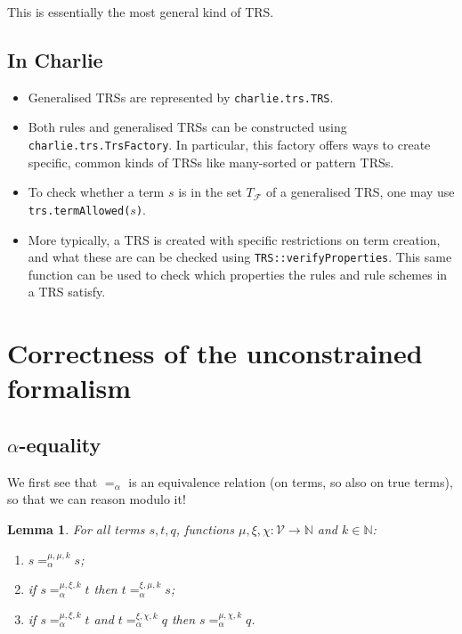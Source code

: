 \documentclass{lmcs}
\theoremstyle{theorem}\newtheorem{theorem}{Theorem}
\theoremstyle{theorem}\newtheorem{lemma}[theorem]{Lemma}
\theoremstyle{theorem}\newtheorem{corollary}[theorem]{Corollary}
\theoremstyle{definition}\newtheorem{definition}[theorem]{Definition}
\theoremstyle{definition}\newtheorem{example}[theorem]{Example}
\newcommand{\N}{\mathbb{N}}
\newcommand{\F}{\mathcal{F}}
\newcommand{\V}{\mathcal{V}}
\begin{document}
This is essentially the most general kind of TRS.

\subsection*{In Charlie}

\begin{itemize}
\item Generalised TRSs are represented by \texttt{charlie.trs.TRS}.
\item Both rules and generalised TRSs can be constructed using
  \texttt{charlie.trs.TrsFactory}.
  In particular, this factory offers ways to create specific, common kinds of
  TRSs like many-sorted or pattern TRSs.
\item To check whether a term $s$ is in the set $T_\F$ of a generalised TRS,
  one may use \texttt{trs.termAllowed($s$)}.
\item More typically, a TRS is created with specific restrictions on term
  creation, and what these are can be checked using
  \texttt{TRS::verifyProperties}.  This same function can be used to check
  which properties the rules and rule schemes in a TRS satisfy.
\end{itemize}

\newpage\appendix

\section{Correctness of the unconstrained formalism}

\subsection{$\alpha$-equality}

We first see that $=_\alpha$ is an equivalence relation (on terms, so also on true terms), so that
we can reason modulo it!

\begin{lemma}\label{lem:alphaequiv}
For all terms $s,t,q$, functions $\mu,\xi,\chi : \V \to \N$ and $k \in \N$:
\begin{enumerate}
\item\label{lem:alphaequiv:reflexive}
  $s =_\alpha^{\mu,\mu,k} s$;
\item\label{lem:alphaequiv:symmetric}
  if $s =_\alpha^{\mu,\xi,k} t$ then $t =_\alpha^{\xi,\mu,k} s$;
\item\label{lem:alphaequiv:transitive}
  if $s =_\alpha^{\mu,\xi,k} t$ and $t =_\alpha^{\xi,\chi,k} q$ then $s =_\alpha^{\mu,\chi,k} q$.
\end{enumerate}
\end{lemma}
\end{document}
